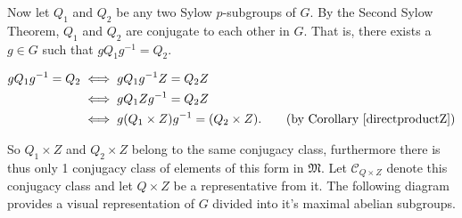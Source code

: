\documentclass[a4paper , 11pt]{book}
\theoremstyle{definition}
\theoremstyle{remark}
\begin{document}
Now let $Q_1$ and $Q_2$ be any two Sylow $p$-subgroups of $G$. By the Second Sylow Theorem, $Q_1$ and $Q_2$ are conjugate to each other in $G$. That is, there exists a $g \in G$ such that $gQ_1g^{-1} = Q_2$.

\begin{align*} gQ_1g^{-1} = Q_2 &\iff gQ_1g^{-1}Z = Q_2Z 
\\ &\iff gQ_1Zg^{-1} = Q_2Z
\\ &\iff g(Q_1 \times Z)g^{-1} = (Q_2 \times Z). \tag{by Corollary \ref{directproductZ}}
\end{align*} 

So $Q_1 \times Z$ and $Q_2 \times Z$ belong to the same conjugacy class, furthermore there is thus only 1 conjugacy class of elements of this form in $\mathfrak{M}$. Let $\mathcal{C}_{Q \times Z}$ denote this conjugacy class and let $Q \times Z$ be a representative from it. The following diagram provides a visual representation of $G$ divided into it's maximal abelian subgroups.
\end{document}
